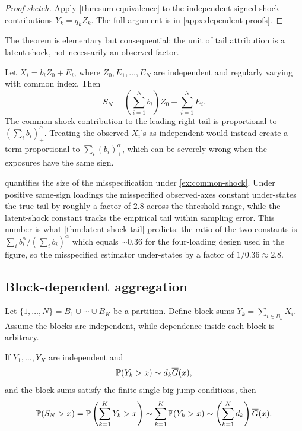 \begin{proof}[Proof sketch]
Apply \cref{thm:sum-equivalence} to the independent signed shock contributions
$Y_k=q_kZ_k$. The full argument is in \cref{appx:dependent-proofs}.
\end{proof}

The theorem is elementary but consequential: the unit of tail attribution is a
latent shock, not necessarily an observed factor.

\begin{example}
\label{ex:common-shock}
Let \(X_i=b_iZ_0+E_i\), where \(Z_0,E_1,\ldots,E_N\) are independent and
regularly varying with common index. Then
\[
  S_N=\left(\sum_{i=1}^N b_i\right)Z_0+
      \sum_{i=1}^N E_i.
\]
The common-shock contribution to the leading right tail is proportional to
\((\sum_i b_i)_+^\alpha\). Treating the observed \(X_i\)'s as independent would
instead create a term proportional to \(\sum_i (b_i)_+^\alpha\), which can be
severely wrong when the exposures have the same sign.
\end{example}



 quantifies the size of the
misspecification under \cref{ex:common-shock}. Under positive same-sign
loadings the misspecified observed-axes constant under-states the true
tail by roughly a factor of $2.8$ across the threshold range, while the
latent-shock constant tracks the empirical tail within sampling error.
This number is what \cref{thm:latent-shock-tail} predicts: the
ratio of the two constants is $\sum_i b_i^\alpha / (\sum_i b_i)^\alpha$
which equals $\sim 0.36$ for the four-loading design used in the
figure, so the misspecified estimator under-states by a factor of
$1/0.36 \approx 2.8$.

\subsection{Block-dependent aggregation}

Let \(\{1,\ldots,N\}=B_1\cup\cdots\cup B_K\) be a partition. Define block sums
\(Y_k=\sum_{i\in B_k}X_i\). Assume the blocks are independent, while dependence
inside each block is arbitrary.

\begin{theorem}
\label{thm:block-reduction}
If \(Y_1,
\ldots,Y_K\) are independent and
\[\mathbb{P}(Y_k>x)\sim d_k\overline{G}(x),\]
and the block sums satisfy the finite single-big-jump conditions, then
\[
  \mathbb{P}(S_N>x)=\mathbb{P}\left(\sum_{k=1}^KY_k>x\right)
  \sim \sum_{k=1}^K\mathbb{P}(Y_k>x)
  \sim \left(\sum_{k=1}^K d_k\right)\overline{G}(x).
\]
\end{theorem}

